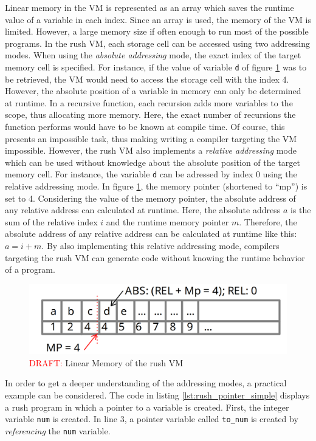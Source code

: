 Linear memory in the VM is represented as an array which saves the runtime value of a variable in each index.
Since an array is used, the memory of the VM is limited.
However, a large memory size if often enough to run most of the possible programs.
In the rush VM, each storage cell can be accessed using two addressing modes.
When using the \emph{absolute addressing} mode, the exact index of the target memory cell is specified.
For instance, if the value of variable \texttt{d} of figure \ref{fig:rush_vm_linmem} was to be retrieved, the VM would need to access the storage cell with the index 4.
However, the absolute position of a variable in memory can only be determined at runtime.
In a recursive function, each recursion adds more variables to the scope, thus allocating more memory.
Here, the exact number of recursions the function performs would have to be known at compile time.
Of course, this presents an impossible task, thus making writing a compiler targeting the VM impossible.
However, the rush VM also implements a \emph{relative addressing} mode which can be used without knowledge about the absolute position of the target memory cell.
For instance, the variable \texttt{d} can be adressed by index 0 using the relative addressing mode.
In figure \ref{fig:rush_vm_linmem}, the memory pointer (shortened to \enquote{mp}) is set to 4.
Considering the value of the memory pointer, the absolute address of any relative address can calculated at runtime.
Here, the absolute address $a$ is the sum of the relative index $i$ and the runtime memory pointer $m$.
Therefore, the absolute address of any relative address can be calculated at runtime like this: $a = i + m$.
By also implementing this relative addressing mode,
compilers targeting the rush VM can generate code without knowing the runtime behavior of a program.

\begin{figure}[h]
	\includegraphics[width=\textwidth]{./vm_linmem_draft.png}
	\caption{\textcolor{red}{DRAFT:} Linear Memory of the rush VM}
	\label{fig:rush_vm_linmem}
\end{figure}

In order to get a deeper understanding of the addressing modes, a practical example can be considered.
The code in listing \ref{lst:rush_pointer_simple} displays a rush program in which a pointer to a variable is created.
First, the integer variable \texttt{num} is created.
In line 3, a pointer variable called \texttt{to\_num} is created by \emph{referencing} the \texttt{num} variable.


